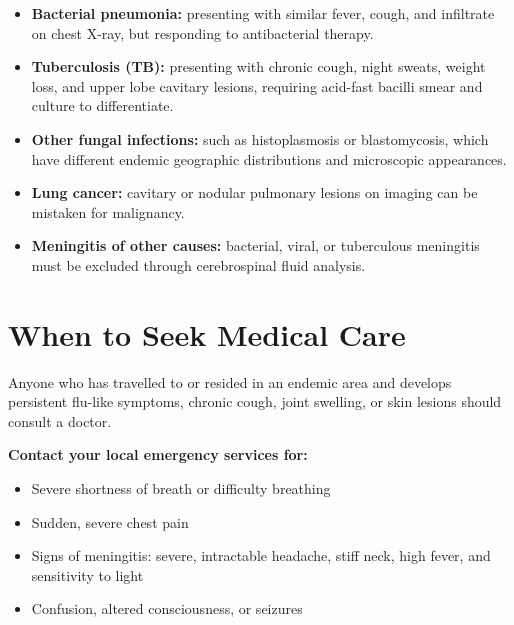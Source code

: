 \begin{itemize}
    \item \textbf{Bacterial pneumonia:} presenting with similar fever, cough, and infiltrate on chest X-ray, but responding to antibacterial therapy.
    \item \textbf{Tuberculosis (TB):} presenting with chronic cough, night sweats, weight loss, and upper lobe cavitary lesions, requiring acid-fast bacilli smear and culture to differentiate.
    \item \textbf{Other fungal infections:} such as histoplasmosis or blastomycosis, which have different endemic geographic distributions and microscopic appearances.
    \item \textbf{Lung cancer:} cavitary or nodular pulmonary lesions on imaging can be mistaken for malignancy.
    \item \textbf{Meningitis of other causes:} bacterial, viral, or tuberculous meningitis must be excluded through cerebrospinal fluid analysis.
\end{itemize}

\section*{When to Seek Medical Care}
Anyone who has travelled to or resided in an endemic area and develops persistent flu-like symptoms, chronic cough, joint swelling, or skin lesions should consult a doctor.

\textbf{Contact your local emergency services for:}
\begin{itemize}
    \item Severe shortness of breath or difficulty breathing
    \item Sudden, severe chest pain
    \item Signs of meningitis: severe, intractable headache, stiff neck, high fever, and sensitivity to light
    \item Confusion, altered consciousness, or seizures
\end{itemize}

